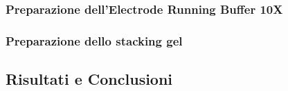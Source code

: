 \subsubsection{Preparazione dell'Electrode Running Buffer 10X}

\subsubsection{Preparazione dello stacking gel}







\subsection{Risultati e Conclusioni}
